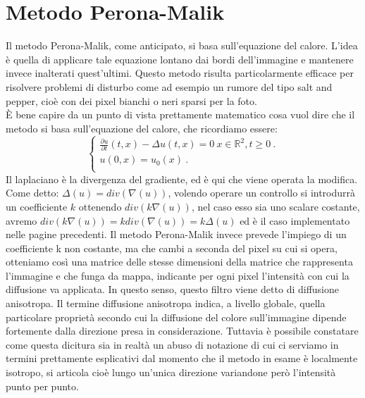 \newpage
\section{Metodo Perona-Malik}

Il metodo Perona-Malik, come anticipato, si basa sull'equazione del calore. L'idea è quella di applicare tale equazione lontano dai bordi dell'immagine e mantenere invece inalterati quest'ultimi.
Questo metodo risulta particolarmente efficace per risolvere problemi di disturbo come ad esempio un rumore del tipo salt and pepper, cioè con dei pixel bianchi o neri sparsi per la foto.\\
\vspace{1em}
\`E bene capire da un punto di vista prettamente matematico cosa vuol dire che il metodo si basa sull'equazione del calore, che ricordiamo essere:\\
$$
\begin{cases}
\frac{\partial u}{\partial t}(t,x)-\Delta u(t,x) = 0 \ x \in \mathbb R^2, t\ge 0 \ .\\ 
u(0,x) = u_0(x)\ . \\
\end{cases}
$$
Il laplaciano è la divergenza del gradiente, ed è qui che viene operata la modifica.\\
Come detto: $\Delta(u)=div(\nabla(u))$, volendo operare un controllo si introdurrà un coefficiente $k$ ottenendo $div(k\nabla(u))$, nel caso esso sia uno scalare costante, avremo $div(k\nabla(u))=kdiv(\nabla(u))=k\Delta(u)$ ed è il caso implementato nelle pagine precedenti. Il metodo Perona-Malik invece prevede l'impiego di un coefficiente k non costante, ma che cambi a seconda del pixel su cui si opera, otteniamo così una matrice delle stesse dimensioni della matrice che rappresenta l'immagine e che funga da mappa, indicante per ogni pixel l'intensità con cui la diffusione va applicata. In questo senso, questo filtro viene detto di diffusione anisotropa.
Il termine diffusione anisotropa indica, a livello globale, quella particolare proprietà secondo cui la diffusione del colore sull'immagine dipende fortemente dalla direzione presa in considerazione. Tuttavia è possibile constatare come questa dicitura sia in realtà un abuso di notazione di cui ci serviamo in termini prettamente esplicativi dal momento che il metodo in esame è localmente isotropo, si articola cioè lungo un’unica direzione variandone però l’intensità punto per punto.
